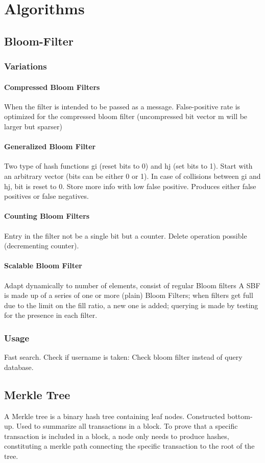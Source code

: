\section{Algorithms}
\subsection{Bloom-Filter}

\subsubsection{Variations}

\paragraph{Compressed Bloom Filters}
When the filter is intended to be passed as a message.
False-positive rate is optimized for the compressed bloom filter (uncompressed bit vector m will be larger but sparser)

\paragraph{Generalized Bloom Filter}
Two type of hash functions gi (reset bits to 0) and hj (set bits to 1).
Start with an arbitrary vector (bits can be either 0 or 1).
In case of collisions between gi and hj, bit is reset to 0.
Store more info with low false positive.
Produces either false positives or false negatives.

\paragraph{Counting Bloom Filters}
Entry in the filter not be a single bit but a counter.
Delete operation possible (decrementing counter).

\paragraph{Scalable Bloom Filter}
Adapt dynamically to number of elements, consist of regular Bloom filters
A SBF is made up of a series of one or more (plain) Bloom Filters;
when filters get full due to the limit on the fill ratio, a new one is added; querying is made by testing for the presence in each filter.

\subsubsection{Usage}
Fast search.
Check if username is taken: Check bloom filter instead of query database.

\subsection{Merkle Tree}
A Merkle tree is a binary hash tree containing leaf nodes.
Constructed bottom-up.
Used to summarize all transactions in a block.
To prove that a specific transaction is included in a block, a node only needs to produce hashes, constituting a merkle path connecting the specific transaction to the root of the tree.

